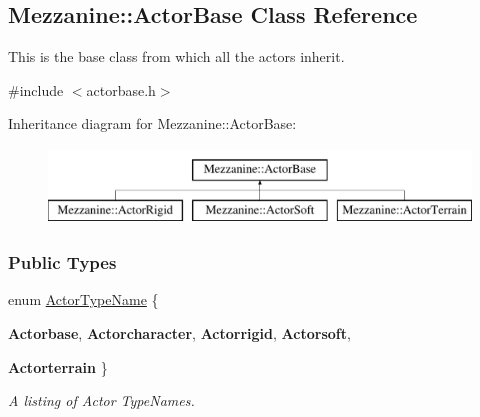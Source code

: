 \hypertarget{classMezzanine_1_1ActorBase}{
\subsection{Mezzanine::ActorBase Class Reference}
\label{classMezzanine_1_1ActorBase}
}


This is the base class from which all the actors inherit.  




{\ttfamily \#include $<$actorbase.h$>$}

Inheritance diagram for Mezzanine::ActorBase:\begin{figure}[H]
\begin{center}
\leavevmode
\includegraphics[height=2.000000cm]{classMezzanine_1_1ActorBase}
\end{center}
\end{figure}
\subsubsection*{Public Types}
\begin{DoxyCompactItemize}
\item 
enum \hyperlink{classMezzanine_1_1ActorBase_a98e1b66ce4973b01abb6d9b858398eb6}{ActorTypeName} \{ \par
{\bfseries Actorbase}, 
{\bfseries Actorcharacter}, 
{\bfseries Actorrigid}, 
{\bfseries Actorsoft}, 
\par
{\bfseries Actorterrain}
 \}
\begin{DoxyCompactList}\small\item\em A listing of Actor TypeNames. \item\end{DoxyCompactList}\end{DoxyCompactItemize}
